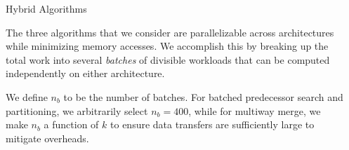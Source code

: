 \documentclass[final]{beamer}
\newlength{\sepwidth}
\newlength{\colwidth}
\newcommand{\separatorcolumn}{\begin{column}{\sepwidth}\end{column}}
\begin{document}
\begin{frame}[t]
\begin{columns}[t]
\separatorcolumn

\begin{column}{\colwidth}

 \begin{block}{Hybrid Algorithms}



\begin{description}[font=$\bullet$~\normalfont\scshape\color{red!50!black}]
\item The three algorithms that we consider are parallelizable across architectures while minimizing memory accesses. We accomplish this by breaking up the total work into several \emph{batches} of divisible workloads that can be computed independently on either architecture. 

\item We define $n_b$ to be the number of batches. For batched predecessor search and partitioning, we arbitrarily select $n_b=400$, while for multiway merge, we make $n_b$ a function of $k$ to ensure data transfers are sufficiently large to mitigate overheads.


\end{description}
\end{block}
\end{column}
\end{columns}
\end{frame}
\end{document}
